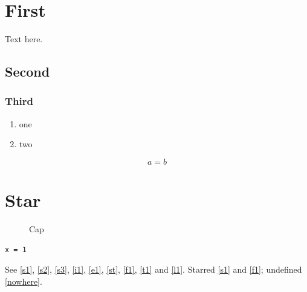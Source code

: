 \documentclass{article}
\begin{document}
\section{First}\label{s1}
Text here.
\subsection{Second}\label{s2}
\subsubsection{Third}\label{s3}
\begin{enumerate}\item one\label{i1} \item two\end{enumerate}
\begin{equation} a=b \label{e1}\end{equation}
\section*{Star}\label{st}
\begin{figure}[h]\centering\caption{Cap}\label{f1}\end{figure}
\begin{table}[h]\centering\caption{Tab}\label{t1}\end{table}
\begin{lstlisting}[caption={Code},label=l1]
x = 1
\end{lstlisting}
See \autoref{s1}, \autoref{s2}, \autoref{s3}, \autoref{i1}, \autoref{e1}, \autoref{st},
\autoref{f1}, \autoref{t1} and \autoref{l1}. Starred \autoref*{s1} and \autoref*{f1}; undefined \autoref{nowhere}.
\end{document}
